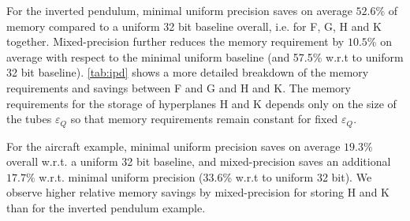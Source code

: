 

For the inverted pendulum, minimal uniform precision saves on average $52.6\%$ of memory
compared to a uniform 32 bit baseline overall, i.e. for F, G, H and K together. 
Mixed-precision further reduces the memory
requirement by $10.5\%$ on average with respect to the minimal uniform baseline (and 57.5\% w.r.t to 
uniform 32 bit baseline). 
\autoref{tab:ipd} shows a more detailed breakdown of the memory requirements and savings
between F and G and H and K.
The memory requirements for the storage of hyperplanes H and K depends only on
the size of the tubes $\varepsilon_Q$ so that memory requirements remain constant
for fixed $\varepsilon_Q$.

For the aircraft example, minimal uniform precision saves on average $19.3\%$
overall w.r.t. a uniform 32 bit baseline, and mixed-precision saves an
additional $17.7\%$ w.r.t. minimal uniform precision (33.6\% w.r.t to uniform 32 bit). We observe higher relative
memory savings by mixed-precision for storing H and K than for the inverted pendulum example.

